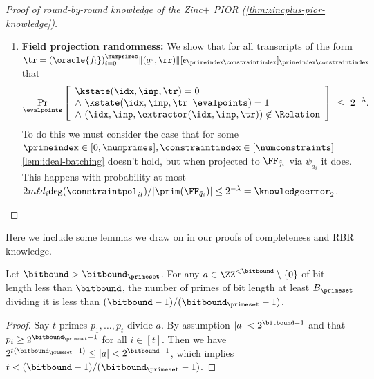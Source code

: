 \begin{proof}[Proof of round-by-round knowledge of the Zinc$+$ PIOR (\cref{thm:zincplus-pior-knowledge})]
\begin{enumerate}[nosep]
    \item \textbf{Field projection randomness:} We show that for all transcripts of the form $\tr = (\oracle{f_i})_{i =0}^{\numprimes}\|(q_0,\rr)\|[e_{\primeindex\constraintindex}]_{\primeindex\constraintindex}$ that
    \[
    \Pr_{\evalpoints}\left[
    \begin{array}{l}
    \kstate(\idx,\inp,\tr) =0 \\
    \wedge\ \kstate(\idx,\inp,\tr\|\evalpoints)=1 \\
    \wedge\ (\idx,\inp,\extractor(\idx,\inp,\tr)) \not\in \Relation
    \end{array}
    \right]
    \ \le\ 2^{-\lambda}.
    \]
    To do this we must consider the case that for some $\primeindex \in [0,\numprimes], \constraintindex \in [\numconstraints]$ \cref{lem:ideal-batching} doesn't hold, but when projected to $\FF_{\tilde{q}_i}$ via $\psi_{a_i}$ it does. This happens with probability at most $2 m \ell d_i \mathsf{deg}(\constraintpol_{it}) /|\prim(\FF_{\tilde{q}_i})| \leq 2^{-\lambda} = \knowledgeerror_2$.
\end{enumerate}
\end{proof}

Here we include some lemmas we draw on in our proofs of completeness and RBR knowledge.

\begin{lemma}
    \label{lemma:app-prime-division-bound}
    Let $\bitbound > \bitbound_\primeset$. For any $a \in \ZZ^{<\bitbound} \setminus \{0\}$ of bit length less than $\bitbound$, the number of primes of bit length at least $B_\primeset$ dividing it is less than $(\bitbound-1)/(\bitbound_\primeset-1)$.
\end{lemma}
\begin{proof}
Say $t$ primes $p_1,\dotsc,p_t$ divide $a$. By assumption $|a| < 2^{\bitbound-1}$ and that $p_i \geq 2^{\bitbound_\primeset-1}$ for all $i \in [t]$. Then we have $2^{t(\bitbound_\primeset-1)} \leq |a| < 2^{\bitbound-1}$, which implies $t < (\bitbound-1)/(\bitbound_\primeset-1)$.
\end{proof}

